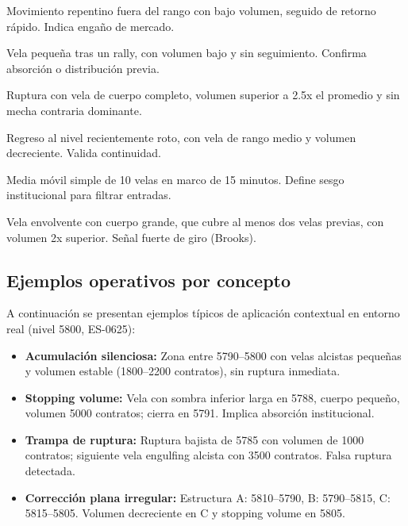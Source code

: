 \begin{description}[leftmargin=2cm, style=nextline]
    \item[Trampa de ruptura:] Movimiento repentino fuera del rango con bajo volumen, seguido de retorno r\'apido. Indica enga\~no de mercado.
    
    \item[Testeo profesional:] Vela peque\~na tras un rally, con volumen bajo y sin seguimiento. Confirma absorci\'on o distribuci\'on previa.
    
    \item[Breakout v\'alido:] Ruptura con vela de cuerpo completo, volumen superior a 2.5x el promedio y sin mecha contraria dominante.
    
    \item[Backtest de nivel:] Regreso al nivel recientemente roto, con vela de rango medio y volumen decreciente. Valida continuidad.
    
    \item[Media direccional de 15m:] Media m\'ovil simple de 10 velas en marco de 15 minutos. Define sesgo institucional para filtrar entradas.
    
    \item[Engulfing decisivo:] Vela envolvente con cuerpo grande, que cubre al menos dos velas previas, con volumen 2x superior. Se\~nal fuerte de giro (Brooks).
\end{description}

\vspace{2em}

\subsection*{Ejemplos operativos por concepto}

A continuaci\'on se presentan ejemplos t\'ipicos de aplicaci\'on contextual en entorno real (nivel 5800, ES-0625):

\begin{itemize}
    \item \textbf{Acumulaci\'on silenciosa:} Zona entre 5790–5800 con velas alcistas peque\~nas y volumen estable (1800–2200 contratos), sin ruptura inmediata.
    
    \item \textbf{Stopping volume:} Vela con sombra inferior larga en 5788, cuerpo pequeño, volumen 5000 contratos; cierra en 5791. Implica absorci\'on institucional.
    
    \item \textbf{Trampa de ruptura:} Ruptura bajista de 5785 con volumen de 1000 contratos; siguiente vela engulfing alcista con 3500 contratos. Falsa ruptura detectada.
    
    \item \textbf{Correcci\'on plana irregular:} Estructura A: 5810–5790, B: 5790–5815, C: 5815–5805. Volumen decreciente en C y stopping volume en 5805.
\end{itemize}

